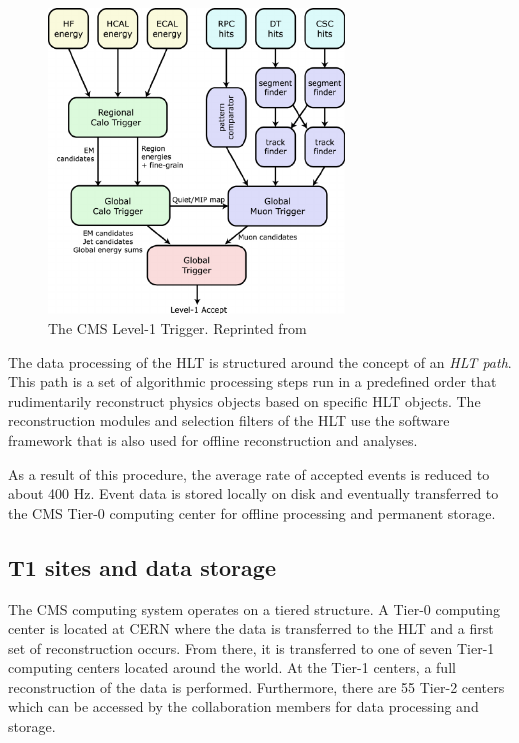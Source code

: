  \begin{figure}[h]
 	\centering
 	\includegraphics[width=0.7\textwidth]{figures/The-CMS-Level-1-Trigger.png}
 	\singlespace
 	\caption{The CMS Level-1 Trigger. Reprinted from \cite{cmsglobaltrigger}}
 	\label{fig:l1trig}
 \end{figure}

The data processing of the HLT is structured around the concept of an \textit{HLT path}. This path is a set of algorithmic processing steps run in a predefined order that rudimentarily reconstruct physics objects based on specific HLT objects. The reconstruction modules and selection filters of the HLT use the software framework that is also used for offline reconstruction and analyses.

As a result of this procedure, the average rate of accepted events is reduced to about 400 Hz. Event data is stored locally on disk and eventually transferred to the CMS Tier-0 computing center for offline processing and permanent storage.


\subsection{T1 sites and data storage}

The CMS computing system operates on a tiered structure. A Tier-0 computing center is located at CERN where the data is transferred to the HLT and a first set of reconstruction occurs. From there, it is transferred to one of seven Tier-1 computing centers located around the world. At the Tier-1 centers, a full reconstruction of the data is performed. Furthermore, there are 55 Tier-2 centers which can be accessed by the collaboration members for data processing and storage.

